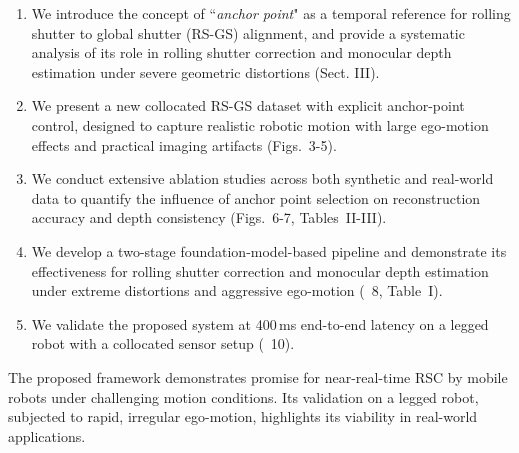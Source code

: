 \begin{enumerate}
    \item We introduce the concept of ``\textit{anchor point}" as a temporal reference for rolling shutter to global shutter (RS-GS) alignment, and provide a systematic analysis of its role in rolling shutter correction and monocular depth estimation under severe geometric distortions (Sect. III).

    \item We present a new collocated RS-GS dataset with explicit anchor-point control, designed to capture realistic robotic motion with large ego-motion effects and practical imaging artifacts (Figs.~3-5).

    \item We conduct extensive ablation studies across both synthetic and real-world data to quantify the influence of anchor point selection on reconstruction accuracy and depth consistency (Figs.~6-7, Tables~II-III).

    \item We develop a two-stage foundation-model-based pipeline and demonstrate its effectiveness for rolling shutter correction and monocular depth estimation under extreme distortions and aggressive ego-motion (\figurename~8, Table~I).
    \item We validate the proposed system at 400\,ms end-to-end latency on a legged robot with a collocated sensor setup (\figurename~10).
\end{enumerate}

The proposed framework demonstrates promise for near-real-time RSC by mobile robots under challenging motion conditions. Its validation on a legged robot, subjected to rapid, irregular ego-motion, highlights its viability in real-world applications.

